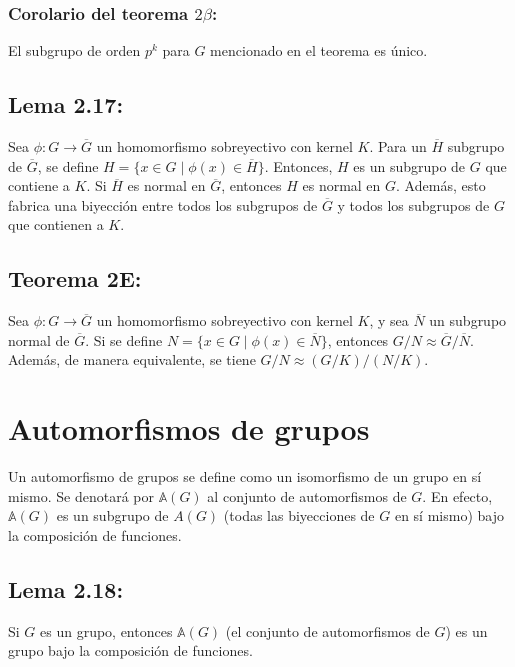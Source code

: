 \documentclass{article}
\begin{document}
\subsubsection*{\color{red} Corolario del teorema $2\beta$:}

El subgrupo de orden $p^k$ para $G$ mencionado en el teorema es único.

\subsection*{\color{blue} Lema 2.17:}

Sea $\phi:G\to\overline{G}$ un homomorfismo sobreyectivo con kernel $K$. Para un $\overline{H}$ subgrupo de $\overline{G}$, se define $H=\{x\in G\mid\phi(x)\in\overline{H}\}$. Entonces, $H$ es un subgrupo de $G$ que contiene a $K$. Si $\overline{H}$ es normal en $\overline{G}$, entonces $H$ es normal en $G$. Además, esto fabrica una biyección entre todos los subgrupos de $\overline{G}$ y todos los subgrupos de $G$ que contienen a $K$.

\subsection*{\color{red} Teorema 2E:}

Sea $\phi:G\to\overline{G}$ un homomorfismo sobreyectivo con kernel $K$, y sea $\overline{N}$ un subgrupo normal de $\overline{G}$. Si se define $N=\{x\in G\mid\phi(x)\in\overline{N}\}$, entonces $G/N\approx \overline{G}/\overline{N}$. Además, de manera equivalente, se tiene $G/N\approx (G/K)/(N/K)$.

\newpage
\section{Automorfismos de grupos}

Un automorfismo de grupos se define como un isomorfismo de un grupo en sí mismo. Se denotará por $\mathbb{A}(G)$ al conjunto de automorfismos de $G$. En efecto, $\mathbb{A}(G)$ es un subgrupo de $A(G)$ (todas las biyecciones de $G$ en sí mismo) bajo la composición de funciones.

\subsection*{\color{blue} Lema 2.18:}

Si $G$ es un grupo, entonces $\mathbb{A}(G)$ (el conjunto de automorfismos de $G$) es un grupo bajo la composición de funciones.
\end{document}
